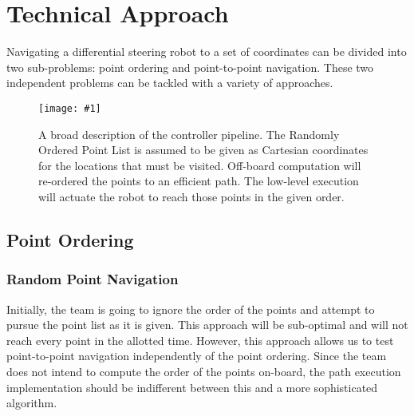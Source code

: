 \documentclass[12pt,conference,onecolumn]{article} %
\newcommand{\myfigure}[4]{
  \begin{figure}[h!]
      \centering
      \texttt{[image: \#1]}
      \caption{#2}
\label{#4}
    \end{figure}
}
\begin{document}
\section*{Technical Approach}

Navigating a differential steering robot to a set of coordinates can be divided into two sub-problems: point ordering and point-to-point navigation. These two independent problems can be tackled with a variety of approaches.

\myfigure{images/Pipeline.jpg}{A broad description of the controller pipeline. The Randomly Ordered Point List is assumed to be given as Cartesian coordinates for the locations that must be visited. Off-board computation will re-ordered the points to an efficient path. The low-level execution will actuate the robot to reach those points in the given order.}{0.5}{fig:pipeline}

\subsection*{Point Ordering}
\subsubsection*{Random Point Navigation}
Initially, the team is going to ignore the order of the points and attempt to pursue the point list as it is given. This approach will be sub-optimal and will not reach every point in the allotted time. However, this approach allows us to test point-to-point navigation independently of the point ordering. Since the team does not intend to compute the order of the points on-board, the path execution implementation should be indifferent between this and a more sophisticated algorithm.
\end{document}
